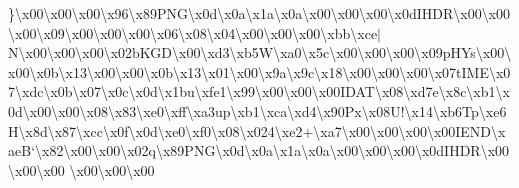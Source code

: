 \}\textbackslash{}x00\textbackslash{}x00\textbackslash{}x00\textbackslash{}x96\textbackslash{}x89\+P\+N\+G\textbackslash{}x0d\textbackslash{}x0a\textbackslash{}x1a\textbackslash{}x0a\textbackslash{}x00\textbackslash{}x00\textbackslash{}x00\textbackslash{}x0d\+I\+H\+D\+R\textbackslash{}x00\textbackslash{}x00\textbackslash{}x00\textbackslash{}x09\textbackslash{}x00\textbackslash{}x00\textbackslash{}x00\textbackslash{}x06\textbackslash{}x08\textbackslash{}x04\textbackslash{}x00\textbackslash{}x00\textbackslash{}x00\textbackslash{}xbb\textbackslash{}xce$\vert$\+N\textbackslash{}x00\textbackslash{}x00\textbackslash{}x00\textbackslash{}x02b\+K\+G\+D\textbackslash{}x00\textbackslash{}xd3\textbackslash{}xb5\+W\textbackslash{}xa0\textbackslash{}x5c\textbackslash{}x00\textbackslash{}x00\textbackslash{}x00\textbackslash{}x09p\+H\+Ys\textbackslash{}x00\textbackslash{}x00\textbackslash{}x0b\textbackslash{}x13\textbackslash{}x00\textbackslash{}x00\textbackslash{}x0b\textbackslash{}x13\textbackslash{}x01\textbackslash{}x00\textbackslash{}x9a\textbackslash{}x9c\textbackslash{}x18\textbackslash{}x00\textbackslash{}x00\textbackslash{}x00\textbackslash{}x07t\+I\+M\+E\textbackslash{}x07\textbackslash{}xdc\textbackslash{}x0b\textbackslash{}x07\textbackslash{}x0c\textbackslash{}x0d\textbackslash{}x1bu\textbackslash{}xfe1\textbackslash{}x99\textbackslash{}x00\textbackslash{}x00\textbackslash{}x00\textquotesingle{}\+I\+D\+A\+T\textbackslash{}x08\textbackslash{}xd7e\textbackslash{}x8c\textbackslash{}xb1\textbackslash{}x0d\textbackslash{}x00\textbackslash{}x00\textbackslash{}x08\textbackslash{}x83\textbackslash{}xe0\textbackslash{}xff\textbackslash{}xa3up\textbackslash{}xb1\textbackslash{}xca\textbackslash{}xd4\textbackslash{}x90\+Px\textbackslash{}x08\+U!\textbackslash{}x14\textbackslash{}xb6\+Tp\textbackslash{}xe6\+H\textbackslash{}x8d\textbackslash{}x87\textbackslash{}xcc\textbackslash{}x0f\textbackslash{}x0d\textbackslash{}xe0\textbackslash{}xf0\textbackslash{}x08\textbackslash{}x024\textbackslash{}xe2+\textbackslash{}xa7\textbackslash{}x00\textbackslash{}x00\textbackslash{}x00\textbackslash{}x00\+I\+E\+N\+D\textbackslash{}xae\+B`\textbackslash{}x82\textbackslash{}x00\textbackslash{}x00\textbackslash{}x02q\textbackslash{}x89\+P\+N\+G\textbackslash{}x0d\textbackslash{}x0a\textbackslash{}x1a\textbackslash{}x0a\textbackslash{}x00\textbackslash{}x00\textbackslash{}x00\textbackslash{}x0d\+I\+H\+D\+R\textbackslash{}x00\textbackslash{}x00\textbackslash{}x00 \textbackslash{}x00\textbackslash{}x00\textbackslash{}x00 